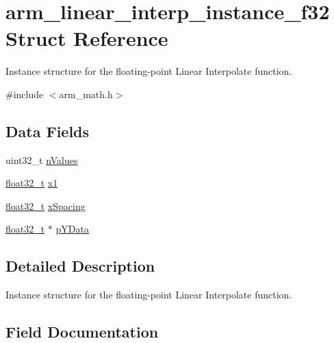 \hypertarget{structarm__linear__interp__instance__f32}{}\section{arm\+\_\+linear\+\_\+interp\+\_\+instance\+\_\+f32 Struct Reference}
\label{structarm__linear__interp__instance__f32}


Instance structure for the floating-\/point Linear Interpolate function.  




{\ttfamily \#include $<$arm\+\_\+math.\+h$>$}

\subsection*{Data Fields}
\begin{DoxyCompactItemize}
\item 
uint32\+\_\+t \mbox{\hyperlink{structarm__linear__interp__instance__f32_a2ea653b0599388e9a72ebab9841707ba}{n\+Values}}
\item 
\mbox{\hyperlink{arm__math_8h_a4611b605e45ab401f02cab15c5e38715}{float32\+\_\+t}} \mbox{\hyperlink{structarm__linear__interp__instance__f32_a795ed79ea4c18d52afe5eb5e868e1c5a}{x1}}
\item 
\mbox{\hyperlink{arm__math_8h_a4611b605e45ab401f02cab15c5e38715}{float32\+\_\+t}} \mbox{\hyperlink{structarm__linear__interp__instance__f32_a08675584bb57fc42bbb3739c13674346}{x\+Spacing}}
\item 
\mbox{\hyperlink{arm__math_8h_a4611b605e45ab401f02cab15c5e38715}{float32\+\_\+t}} $\ast$ \mbox{\hyperlink{structarm__linear__interp__instance__f32_af1489866b69eb5db1e0afeb24c7b01e9}{p\+Y\+Data}}
\end{DoxyCompactItemize}


\subsection{Detailed Description}
Instance structure for the floating-\/point Linear Interpolate function. 

\subsection{Field Documentation}
\mbox{\label{structarm__linear__interp__instance__f32_a2ea653b0599388e9a72ebab9841707ba}} 
